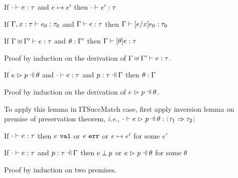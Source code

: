 \begin{thm}[Preservation]
  \label{thrm:preservation}
  If $\cdot \vdash e : \tau$ and $e \mapsto e'$
  then $\cdot \vdash e' : \tau$
\end{thm}

\begin{lem}[Substitution]
  \label{lemma:substitution}
  If $\Gamma, x : \tau \vdash e_0 : \tau_0$ and $\Gamma \vdash e : \tau$
  then $\Gamma \vdash [e/x]e_0 : \tau_0$
\end{lem}

\begin{lem}
  \label{lemma:simult-substitution}
  If $\Gamma \uplus \Gamma' \vdash e : \tau$ and $\theta : \Gamma'$
  then $\Gamma \vdash [\theta]e : \tau$
\end{lem}
Proof by induction on the derivation of $\Gamma \uplus \Gamma' \vdash e : \tau$.

\begin{lem}
  \label{lemma:subs-typing}
  If $\hpatmatch{e}{p}{\theta}$ and $\cdot \vdash e : \tau$ and $\hpattyp{p}{\tau}{\Gamma}$
  then $\theta : \Gamma$
\end{lem}
Proof by induction on the derivation of $\hpatmatch{e}{p}{\theta}$.

To apply this lemma in ITSuccMatch case, first apply inversion lemma on premise of preservation theorem,
\emph{i.e.}, $\hexptyp{\cdot}{\hpatmatch{e}{p}{\theta}}{\trul{\tau_1}{\tau_2}}$

\begin{thm}[Progress]
  \label{thrm:progrs}
  If $\cdot \vdash e : \tau$
  then $e ~\mathtt{val}$ or $e ~\mathtt{err}$ or $e \mapsto e'$ for some $e'$
\end{thm}

\begin{lem}
  \label{lemma:match-progress}
  If $\cdot \vdash e : \tau$ and $\hpattyp{p}{\tau}{\Gamma}$
  then $e \mathbin{\bot} p$ or $\hpatmatch{e}{p}{\theta}$ for some $\theta$
\end{lem}
Proof by induction on two premises.